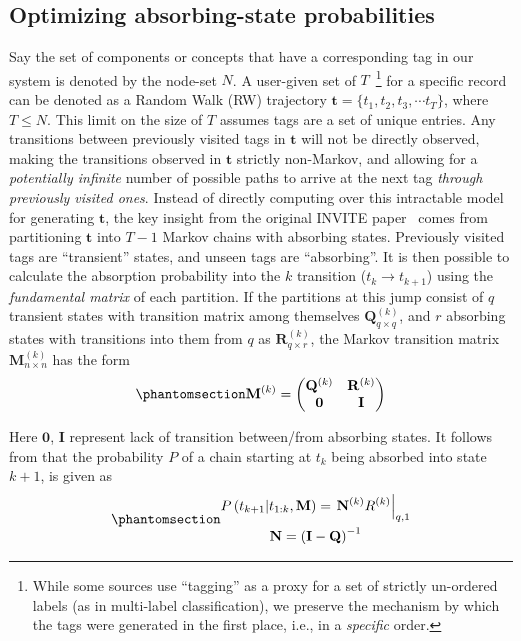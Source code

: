 \documentclass[%
	12pt,
		oneside,
		letterpaper
]{book}
\begin{document}
\subsection{Optimizing absorbing-state probabilities}\label{optimizing-absorbing-state-probabilities}

Say the set of components or concepts that have a corresponding tag in our system is denoted by the node-set \(N\).
A user-given set of \(T\)~\footnote{While some sources use ``tagging'' as a proxy for a set of strictly
  un-ordered labels (as in multi-label classification), we preserve
  the mechanism by which the tags were generated in the first place,
  i.e., in a \emph{specific} order.} for a specific record can be denoted as a Random Walk (RW) trajectory \(\mathbf{t}=\{t_1, t_2, t_3, \cdots t_{T}\}\), where \(T\leq N\).
This limit on the size of \(T\) assumes tags are a set of unique entries.
Any transitions between previously visited tags in \(\mathbf{t}\) will not be directly observed, making the transitions observed in \(\mathbf{t}\) strictly non-Markov, and allowing for a \emph{potentially infinite} number of possible paths to arrive at the next tag \emph{through previously visited ones}.
Instead of directly computing over this intractable model for generating \(\mathbf{t}\), the key insight from the original INVITE paper~\autocite{Humanmemorysearch_Jun2015} comes from partitioning \(\mathbf{t}\) into \(T-1\) Markov chains with absorbing states.
Previously visited tags are ``transient'' states, and unseen tags are ``absorbing''.
It is then possible to calculate the absorption probability into the \(k\) transition (\(t_k \rightarrow t_{k+1}\)) using the \emph{fundamental matrix} of each partition.
If the partitions at this jump consist of \(q\) transient states with transition matrix among themselves \(\mathbf{Q}^{(k)}_{q\times q}\), and \(r\) absorbing states with transitions into them from \(q\) as \(\mathbf{R}^{(k)}_{q\times r}\), the Markov transition matrix \(\mathbf{M}^{(k)}_{n\times n}\) has the form
\begin{equation}\phantomsection\label{eq-trans-matrix}{
\mathbf{M}^{(k)} =
    \begin{pmatrix}
        \mathbf{Q}^{(k)}  & \mathbf{R}^{(k)} \\
        \mathbf{0}        & \mathbf{I}
    \end{pmatrix}
}\end{equation}

Here \(\mathbf{0}\), \(\mathbf{I}\) represent lack of transition between/from absorbing states.
It follows from \autocite{RandomWalksElectric_Doyle2000} that the probability \(P\) of a chain starting at \(t_k\) being absorbed into state \(k+1\), is given as
\begin{equation}\phantomsection\label{eq-absorb}{
\begin{gathered}
    P\left(t_{k+1} \middle| t_{1:k},\mathbf{M}\right) =
        \left.\mathbf{N}^{(k)}R^{(k)}\right|_{q,1}\\
\mathbf{N} = \left( \mathbf{I}-\mathbf{Q} \right) ^{-1}
\end{gathered}
}\end{equation}
\end{document}
